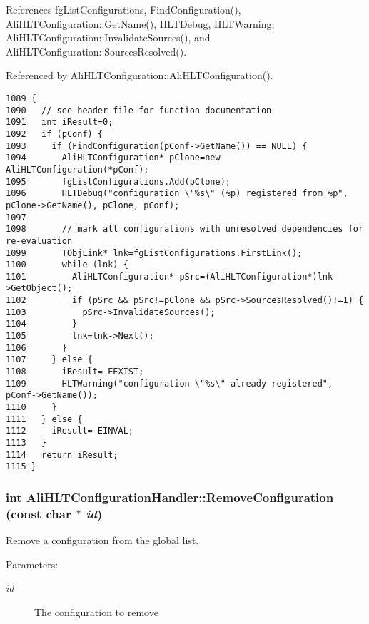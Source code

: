 References fg\-List\-Configurations, Find\-Configuration(), Ali\-HLTConfiguration::Get\-Name(), HLTDebug, HLTWarning, Ali\-HLTConfiguration::Invalidate\-Sources(), and Ali\-HLTConfiguration::Sources\-Resolved().

Referenced by Ali\-HLTConfiguration::Ali\-HLTConfiguration().

\footnotesize\begin{verbatim}1089 {
1090   // see header file for function documentation
1091   int iResult=0;
1092   if (pConf) {
1093     if (FindConfiguration(pConf->GetName()) == NULL) {
1094       AliHLTConfiguration* pClone=new AliHLTConfiguration(*pConf);
1095       fgListConfigurations.Add(pClone);
1096       HLTDebug("configuration \"%s\" (%p) registered from %p", pClone->GetName(), pClone, pConf);
1097 
1098       // mark all configurations with unresolved dependencies for re-evaluation
1099       TObjLink* lnk=fgListConfigurations.FirstLink();
1100       while (lnk) {
1101         AliHLTConfiguration* pSrc=(AliHLTConfiguration*)lnk->GetObject();
1102         if (pSrc && pSrc!=pClone && pSrc->SourcesResolved()!=1) {
1103           pSrc->InvalidateSources();
1104         }
1105         lnk=lnk->Next();
1106       }
1107     } else {
1108       iResult=-EEXIST;
1109       HLTWarning("configuration \"%s\" already registered", pConf->GetName());
1110     }
1111   } else {
1112     iResult=-EINVAL;
1113   }
1114   return iResult;
1115 }
\end{verbatim}\normalsize 


\subsubsection{\setlength{\rightskip}{0pt plus 5cm}int Ali\-HLTConfiguration\-Handler::Remove\-Configuration (const char $\ast$ {\em id})}\label{classAliHLTConfigurationHandler_a5}


Remove a configuration from the global list. \begin{Desc}
\item[Parameters:]
\begin{description}
\item[{\em id}]The configuration to remove \end{description}
\end{Desc}


